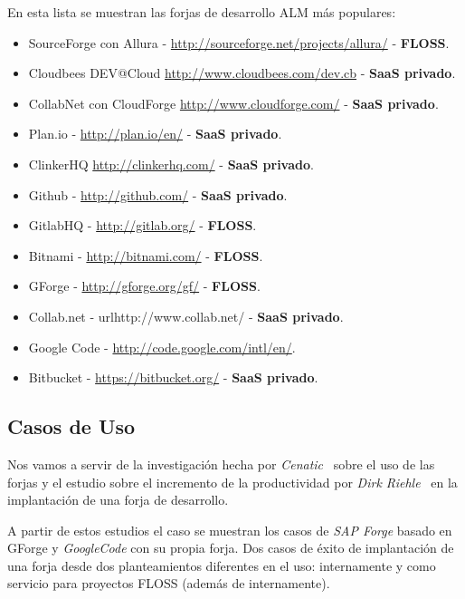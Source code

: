 \par En esta lista se muestran las forjas de desarrollo ALM más populares:

\begin{itemize}
	\item SourceForge con Allura - \url{http://sourceforge.net/projects/allura/} - \textbf{FLOSS}.
	\item Cloudbees DEV@Cloud \url{http://www.cloudbees.com/dev.cb} - \textbf{SaaS privado}.
	\item CollabNet con CloudForge \url{http://www.cloudforge.com/} - \textbf{SaaS privado}.
	\item Plan.io - \url{http://plan.io/en/} - \textbf{SaaS privado}.
	\item ClinkerHQ \url{http://clinkerhq.com/} - \textbf{SaaS privado}.
	\item Github - \url{http://github.com/} - \textbf{SaaS privado}.
    \item GitlabHQ - \url{http://gitlab.org/} - \textbf{FLOSS}.
	\item Bitnami - \url{http://bitnami.com/} - \textbf{FLOSS}.
	\item GForge - \url{http://gforge.org/gf/} - \textbf{FLOSS}.
	\item Collab.net - url{http://www.collab.net/} - \textbf{SaaS privado}.
	\item Google Code - \url{http://code.google.com/intl/en/}.
	\item Bitbucket - \url{https://bitbucket.org/} - \textbf{SaaS privado}.
\end{itemize}


\subsection{Casos de Uso}
\label{sub:casos-de-uso}

\par Nos vamos a servir de la investigación hecha por \emph{Cenatic}~\cite{cenatic-forjas} sobre el uso de las forjas y el estudio sobre el incremento de la productividad por \emph{Dirk Riehle}~\cite{open-collaboration-forges} en la implantación de una forja de desarrollo.

\par A partir de estos estudios el caso se muestran los casos de \emph{SAP Forge} basado en GForge y \emph{GoogleCode} con su propia forja. Dos casos de éxito de implantación de una forja desde dos planteamientos diferentes en el uso: internamente y como servicio para proyectos FLOSS (además de internamente).

